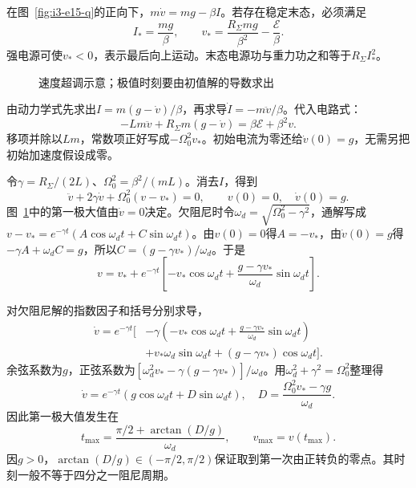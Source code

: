 \begin{solution}
在图~\ref{fig:i3-e15-q}的正向下，$m\dot v=mg-\beta I$。若存在稳定末态，必须满足
\[
I_*=\frac{mg}{\beta},\qquad
\boxed{v_*=\frac{R_\Sigma mg}{\beta^2}-\frac{\mathcal E}{\beta}}.
\]
强电源可使$v_*<0$，表示最后向上运动。末态电源功与重力功之和等于$R_\Sigma I_*^2$。


\begin{figure}[H]\centering
{}
\caption{速度超调示意；极值时刻要由初值解的导数求出}\label{fig:i3-e15-s}
\end{figure}


由动力学式先求出$I=m(g-\dot v)/\beta$，再求导$\dot I=-m\ddot v/\beta$。代入电路式：
\[
-Lm\ddot v+R_\Sigma m(g-\dot v)
=\beta\mathcal E+\beta^2v.
\]
移项并除以$Lm$，常数项正好写成$-\Omega_0^2v_*$。初始电流为零还给$\dot v(0)=g$，无需另把初始加速度假设成零。


令$\gamma=R_\Sigma/(2L)$、$\Omega_0^2=\beta^2/(mL)$。消去$I$，得到
\[
\ddot v+2\gamma\dot v+\Omega_0^2(v-v_*)=0,\qquad
v(0)=0,\quad\dot v(0)=g.
\]
图~\ref{fig:i3-e15-s}中的第一极大值由$\dot v=0$决定。欠阻尼时令$\omega_d=\sqrt{\Omega_0^2-\gamma^2}$，通解写成$v-v_*=e^{-\gamma t}(A\cos\omega_dt+C\sin\omega_dt)$。由$v(0)=0$得$A=-v_*$，由$\dot v(0)=g$得$-\gamma A+\omega_dC=g$，所以$C=(g-\gamma v_*)/\omega_d$。于是
\[
v=v_*+e^{-\gamma t}\left[-v_*\cos\omega_dt+
\frac{g-\gamma v_*}{\omega_d}\sin\omega_dt\right].
\]



对欠阻尼解的指数因子和括号分别求导，
\[\begin{aligned}
\dot v=e^{-\gamma t}\bigg[&-\gamma\left(-v_*\cos\omega_dt
+\frac{g-\gamma v_*}{\omega_d}\sin\omega_dt\right)\\
&+v_*\omega_d\sin\omega_dt+(g-\gamma v_*)\cos\omega_dt\bigg].
\end{aligned}\]
余弦系数为$g$，正弦系数为$[\omega_d^2v_*-\gamma(g-\gamma v_*)]/\omega_d$。用$\omega_d^2+\gamma^2=\Omega_0^2$整理得
\[
\dot v=e^{-\gamma t}(g\cos\omega_dt+D\sin\omega_dt),\quad
D=\frac{\Omega_0^2v_*-\gamma g}{\omega_d}.
\]
因此第一极大值发生在
\[
\boxed{t_{\max}=\frac{\pi/2+\arctan(D/g)}{\omega_d}},
\qquad v_{\max}=v(t_{\max}).
\]
因$g>0$，$\arctan(D/g)\in(-\pi/2,\pi/2)$保证取到第一次由正转负的零点。其时刻一般不等于四分之一阻尼周期。


\end{solution}
